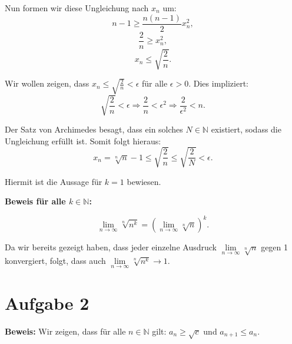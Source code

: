 \documentclass[11pt]{article}
\begin{document}
Nun formen wir diese Ungleichung nach \(x_{n}\) um:
\[
n - 1 \geq \frac{n(n-1)}{2} x_{n}^{2},
\]
\[
\frac{2}{n} \geq x_{n}^{2},
\]
\[
x_{n} \leq \sqrt{\frac{2}{n}}.
\]

Wir wollen zeigen, dass \( x_{n} \leq \sqrt{\frac{2}{n}} < \epsilon \) für alle \(\epsilon > 0\). Dies impliziert:
\[
\sqrt{\frac{2}{n}} < \epsilon \Rightarrow \frac{2}{n} < \epsilon^{2} \Rightarrow \frac{2}{\epsilon^{2}} < n.
\]

Der Satz von Archimedes besagt, dass ein solches \(N \in \mathbb{N}\) existiert, sodass die Ungleichung erfüllt ist. Somit folgt hieraus:
\[
x_{n} = \sqrt[n]{n} - 1 \leq \sqrt{\frac{2}{n}} \leq \sqrt{\frac{2}{N}} < \epsilon.
\]

Hiermit ist die Aussage für \(k = 1\) bewiesen.

\textbf{Beweis für alle \(k \in \mathbb{N}\):}

\[
\lim\limits_{n \rightarrow \infty} \sqrt[n]{n^{k}} = \left(\lim\limits_{n \rightarrow \infty} \sqrt[n]{n}\right)^k.
\]

Da wir bereits gezeigt haben, dass jeder einzelne Ausdruck \(\lim\limits_{n \rightarrow \infty} \sqrt[n]{n}\) gegen 1 konvergiert, folgt, dass auch \(\lim\limits_{n \rightarrow \infty} \sqrt[n]{n^{k}} \rightarrow 1\).

\section*{Aufgabe 2}

\textbf{Beweis:} Wir zeigen, dass für alle \( n \in \mathbb{N} \) gilt: \( a_n \geq \sqrt{c} \) und \( a_{n+1} \leq a_n \).
\end{document}
